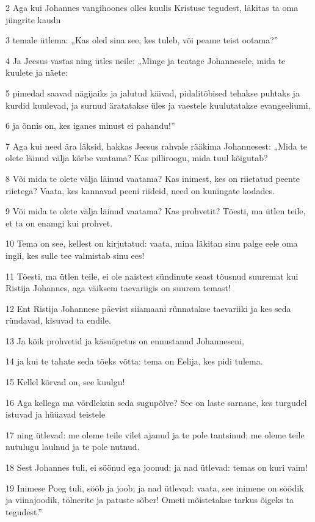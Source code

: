 \par 2 Aga kui Johannes vangihoones olles kuulis Kristuse tegudest, läkitas ta oma jüngrite kaudu
\par 3 temale ütlema: „Kas oled sina see, kes tuleb, või peame teist ootama?”
\par 4 Ja Jeesus vastas ning ütles neile: „Minge ja teatage Johannesele, mida te kuulete ja näete:
\par 5 pimedad saavad nägijaiks ja jalutud käivad, pidalitõbised tehakse puhtaks ja kurdid kuulevad, ja surnud äratatakse üles ja vaestele kuulutatakse evangeeliumi,
\par 6 ja õnnis on, kes iganes minust ei pahandu!”
\par 7 Aga kui need ära läksid, hakkas Jeesus rahvale rääkima Johannesest: „Mida te olete läinud välja kõrbe vaatama? Kas pilliroogu, mida tuul kõigutab?
\par 8 Või mida te olete välja läinud vaatama? Kas inimest, kes on riietatud peente riietega? Vaata, kes kannavad peeni riideid, need on kuningate kodades.
\par 9 Või mida te olete välja läinud vaatama? Kas prohvetit? Tõesti, ma ütlen teile, et ta on enamgi kui prohvet.
\par 10 Tema on see, kellest on kirjutatud: vaata, mina läkitan sinu palge eele oma ingli, kes sulle tee valmistab sinu ees!
\par 11 Tõesti, ma ütlen teile, ei ole naistest sündinute seast tõusnud suuremat kui Ristija Johannes, aga väiksem taevariigis on suurem temast!
\par 12 Ent Ristija Johannese päevist siiamaani rünnatakse taevariiki ja kes seda ründavad, kisuvad ta endile.
\par 13 Ja kõik prohvetid ja käsuõpetus on ennustanud Johanneseni,
\par 14 ja kui te tahate seda tõeks võtta: tema on Eelija, kes pidi tulema.
\par 15 Kellel kõrvad on, see kuulgu!
\par 16 Aga kellega ma võrdleksin seda sugupõlve? See on laste sarnane, kes turgudel istuvad ja hüüavad teistele
\par 17 ning ütlevad: me oleme teile vilet ajanud ja te pole tantsinud; me oleme teile nutulugu laulnud ja te pole nutnud.
\par 18 Sest Johannes tuli, ei söönud ega joonud; ja nad ütlevad: temas on kuri vaim!
\par 19 Inimese Poeg tuli, sööb ja joob; ja nad ütlevad: vaata, see inimene on söödik ja viinajoodik, tölnerite ja patuste sõber! Ometi mõistetakse tarkus õigeks ta tegudest.”

